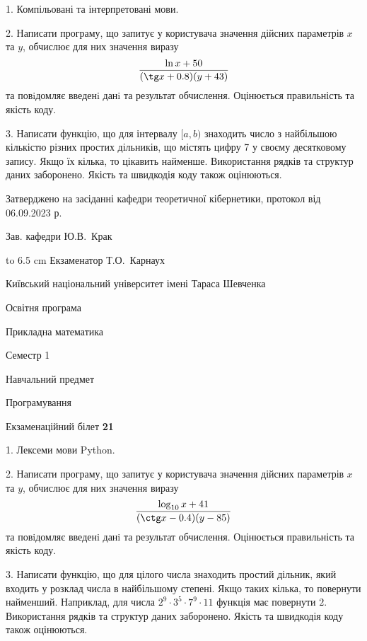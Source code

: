 \documentclass[12pt, ukrainian]{article}
\begin{document}
{%
1. Компільовані та інтерпретовані мови.%
\par
2. Написати програму, що запитує у користувача значення дійсних параметрів $x$ та $y$, обчислює для них значення виразу 
$$\frac{\ln x + 50}{(\tg x + 0.8) (y + 43)}$$ 
та повiдомляє введенi данi та результат обчислення.
 Оцінюється правильність та якість коду.

\par
3. Написати функцію, що для інтервалу $[a, b)$ знаходить число з найбільшою кількістю різних простих дільників, що містять цифру 7 у своєму десятковому запису. Якщо їх кілька, то цікавить найменше.  Використання рядків та структур даних заборонено. Якість та швидкодія коду також оцінюються. 

}
{\smallskip\smallskip \begin {scriptsize} Затверджено на засіданні кафедри теоретичної кібернетики, протокол   від   06.09.2023 р.\par\smallskip\smallskip\smallskip\smallskip
{\parbox {6.5 cm} {Зав. кафедри \dotfill Ю.В.~Крак}}\hspace {0.7cm} {\hbox to 6.5 cm { Екзаменатор \dotfill Т.О.~Карнаух}} \end{scriptsize}}
\vspace{0.9cm}
{{\begin {scriptsize}\par
{ \center  Київський національний університет імені Тараса Шевченка \par}
{\parbox {5 cm}{Освітня програма \hfill}{\parbox {7 cm}{Прикладна математика\hfill}}\parbox {6 cm}{\hfill Семестр 1}}\par
{\parbox {5 cm} {Навчальний предмет \hfill}\parbox {7 cm}{Програмування \hfill}\parbox {6cm}{\hfill}\par}\vspace{-15pt} \end{scriptsize}}{\center Екзаменаційний білет \No \textbf { 21 }\par}}
{%
1. Лексеми мови Python.%
\par
2. Написати програму, що запитує у користувача значення дійсних параметрів $x$ та $y$, обчислює для них значення виразу 
$$\frac{\log_{10} x + 41}{(\ctg x - 0.4) (y - 85)}$$ 
та повiдомляє введенi данi та результат обчислення.
 Оцінюється правильність та якість коду.

\par
3. Написати функцію, що для цілого числа знаходить простий дільник, який входить у розклад числа в найбільшому степені. Якщо таких кілька, то повернути найменший. Наприклад, для числа $2^{9}{\cdot}3^5{\cdot}7^9{\cdot}11$ функція має повернути $2$.  Використання рядків та структур даних заборонено. Якість та швидкодія коду також оцінюються. 

}
\end{document}
